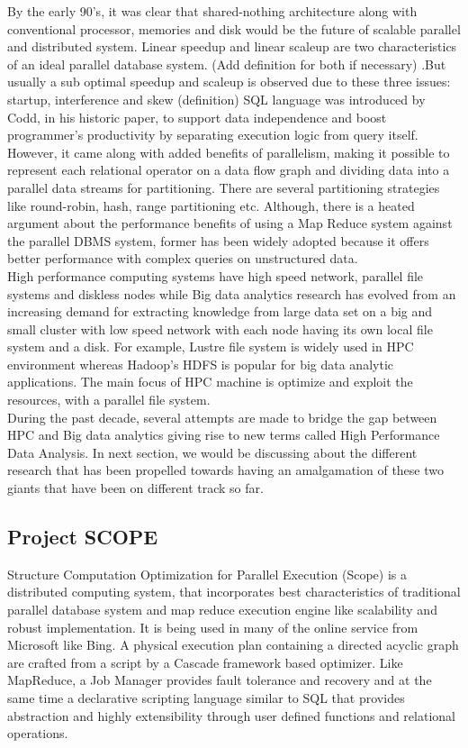 \documentclass[runningheads,a4paper]{llncs}
\begin{document}
By the early 90's, it was clear that shared-nothing architecture along with conventional processor, memories and disk would be the future of scalable parallel and distributed system. Linear speedup and linear scaleup are two characteristics of an ideal parallel database system. (Add definition for both if necessary) .But usually a sub optimal speedup and scaleup is observed due to these three issues: startup, interference and skew (definition)
SQL language was introduced by Codd, in his historic paper, to support data independence and boost programmer's productivity by separating execution logic from query itself. However, it came along with added benefits of parallelism, making it possible to represent each relational operator on a data flow graph and dividing data into a parallel data streams for partitioning. There are several partitioning strategies like round-robin, hash, range partitioning etc.
Although, there is a heated argument about the performance benefits of using a Map Reduce system against the parallel DBMS system, former has been widely adopted because it offers better performance with complex queries on unstructured data.\\


High performance computing systems have high speed network, parallel file systems and diskless nodes while Big data analytics research has evolved from an increasing demand for extracting knowledge from large data set on a big and small cluster with low speed network with each node having its own local file system and a disk. For example, Lustre file system is widely used in HPC environment whereas Hadoop's HDFS is popular for big data analytic applications. The main focus of HPC machine is optimize and exploit the resources, with a parallel file system.\\

During the past decade, several attempts are made to bridge the gap between HPC and Big data analytics giving rise to new terms called High Performance Data Analysis. In next section, we would be discussing about the different research that has been propelled towards having an amalgamation of these two giants that have been on different track so far.

\subsection{Project SCOPE}
Structure Computation Optimization for Parallel Execution (Scope) is a distributed computing system, that incorporates best characteristics of traditional parallel database system and map reduce execution engine like scalability and robust implementation. It is being used in many of the online service from Microsoft like Bing. A physical execution plan containing a directed acyclic graph are crafted from a script by a Cascade framework based optimizer.  Like MapReduce, a Job Manager provides fault tolerance and recovery and at the same time a declarative scripting language similar to SQL that provides abstraction and highly extensibility through user defined functions and relational operations.\\
\end{document}

